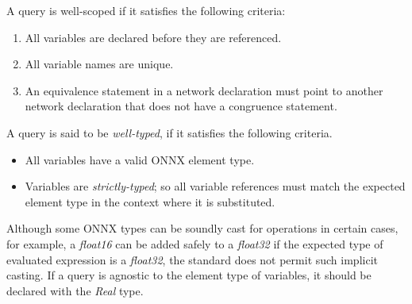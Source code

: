 A \vnnlib{} query is well-scoped if it satisfies the following criteria:
\begin{enumerate}
    \item All variables are declared before they are referenced.
    \item All variable names are unique.
    \item An equivalence statement in a network declaration must point to another network declaration that does not have a congruence statement.
\end{enumerate}
A \vnnlib{} query is said to be \textit{well-typed}, if it satisfies the following criteria.
\begin{itemize}
    \item All variables have a valid ONNX element type.
    \item Variables are \textit{strictly-typed}; so all variable references must match the expected element type in the context where it is substituted.
\end{itemize}

Although some ONNX types can be soundly cast for operations in certain cases, for example, a \textit{float16} can be added safely to a \textit{float32} if the expected type of evaluated expression is a \textit{float32}, the \vnnlib{} standard does not permit such implicit casting.
If a query is agnostic to the element type of variables, it should be declared with the \textit{Real} type.

